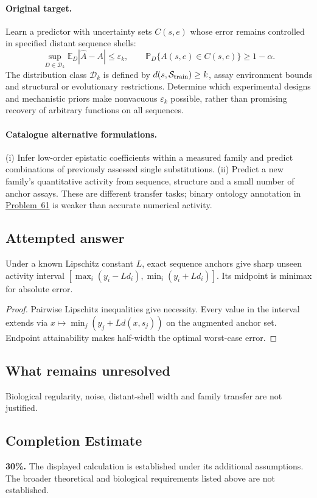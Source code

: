\documentclass[11pt]{article}
\begin{document}
\paragraph{Original target.}
Learn a predictor with uncertainty sets $C(s,e)$ whose error remains controlled in specified distant sequence shells:
\[\sup_{D\in\mathcal D_k}\mathbb{E}_D|\widehat A-A|\le\varepsilon_k,\qquad \mathbb{P}_D\{A(s,e)\in C(s,e)\}\ge1-\alpha.\]
The distribution class $\mathcal D_k$ is defined by $d(s,\mathcal S_{\rm train})\ge k$, assay environment bounds and structural or evolutionary restrictions. Determine which experimental designs and mechanistic priors make nonvacuous $\varepsilon_k$ possible, rather than promising recovery of arbitrary functions on all sequences.
\paragraph{Catalogue alternative formulations.}
(i) Infer low-order epistatic coefficients within a measured family and predict combinations of previously assessed single substitutions. (ii) Predict a new family's quantitative activity from sequence, structure and a small number of anchor assays. These are different transfer tasks; binary ontology annotation in \href{https://we-solve.github.io/problems/computational-protein-function-prediction-f60af957/}{Problem~61} is weaker than accurate numerical activity.
\subsection{Attempted answer}
\begin{proposition}
Under a known Lipschitz constant $L$, exact sequence anchors give sharp unseen activity interval $[\max_i(y_i-Ld_i),\min_i(y_i+Ld_i)]$. Its midpoint is minimax for absolute error.
\end{proposition}
\begin{proof}
Pairwise Lipschitz inequalities give necessity. Every value in the interval extends via $x\mapsto\min_j(y_j+Ld(x,s_j))$ on the augmented anchor set. Endpoint attainability makes half-width the optimal worst-case error.
\end{proof}
\subsection{What remains unresolved}
Biological regularity, noise, distant-shell width and family transfer are not justified.
\subsection{Completion Estimate}
\textbf{30\%.} The displayed calculation is established under its additional assumptions. The broader theoretical and biological requirements listed above are not established.
\end{document}
